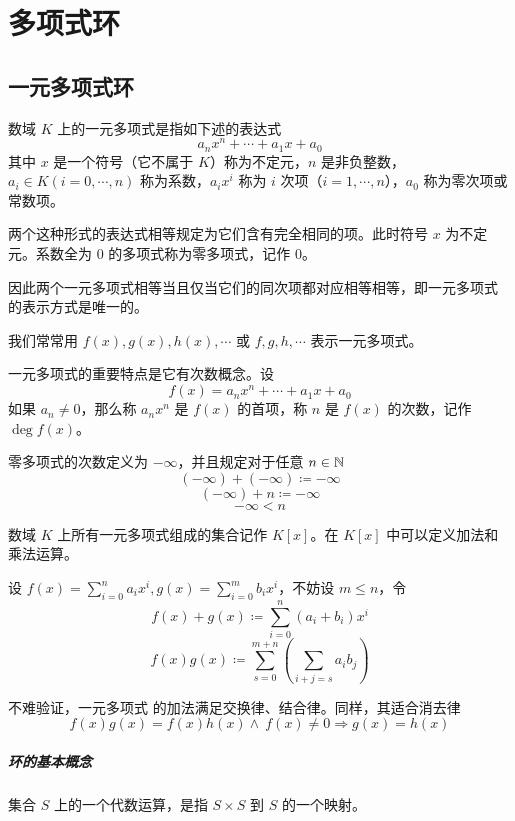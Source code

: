 
\chapter{多项式环}

\section{一元多项式环}

\begin{definition}[一元多项式]
    数域 $K$ 上的一元多项式是指如下述的表达式
    \[a_nx^n+\cdots + a_1x + a_0\]
    其中 $x$ 是一个符号（它不属于 $K$）称为不定元，$n$ 是非负整数，$a_i\in K(i=0,\cdots,n)$ 称为系数，$a_ix^i$ 称为 $i$ 次项（$i=1,\cdots,n$），$a_0$ 称为零次项或常数项。
\end{definition}

两个这种形式的表达式相等规定为它们含有完全相同的项。此时符号 $x$ 为不定元。系数全为 $0$ 的多项式称为零多项式，记作 $0$。

因此两个一元多项式相等当且仅当它们的同次项都对应相等相等，即一元多项式 的表示方式是唯一的。

我们常常用 $f(x),g(x),h(x),\cdots$ 或 $f,g,h,\cdots$ 表示一元多项式。

一元多项式的重要特点是它有次数概念。设
\[f(x) = a_nx^n+\cdots + a_1x + a_0\]
如果 $a_n\ne 0$，那么称 $a_nx^n$ 是 $f(x)$ 的首项，称 $n$ 是 $f(x)$ 的次数，记作 $\deg f(x)$。

零多项式的次数定义为 $-\infty$，并且规定对于任意 $n\in \mathbb{N}$
\[(-\infty)+(-\infty)\coloneqq -\infty\]
\[(-\infty) +n \coloneqq  -\infty\]
\[-\infty < n\]

数域 $K$ 上所有一元多项式组成的集合记作 $K[x]$。在 $K[x]$ 中可以定义加法和乘法运算。

设 $f(x) = \displaystyle\sum_{i=0}^na_ix^i,g(x) = \sum_{i=0}^mb_ix^i$，不妨设 $m \leqslant n$，令
\[f(x) + g(x) \coloneqq  \sum_{i=0}^n(a_i+b_i)x^i\]
\[f(x)g(x) \coloneqq  \sum_{s=0}^{m+n}\left(\sum_{i+j=s}a_ib_j\right)\]

不难验证，一元多项式 的加法满足交换律、结合律。同样，其适合消去律
\[f(x)g(x) = f(x)h(x) \land \ f(x)\ne 0 \Rightarrow g(x) = h(x)\]

\paragraph{环的基本概念}

集合 $S$ 上的一个代数运算，是指 $S\times S$ 到 $S$ 的一个映射。

